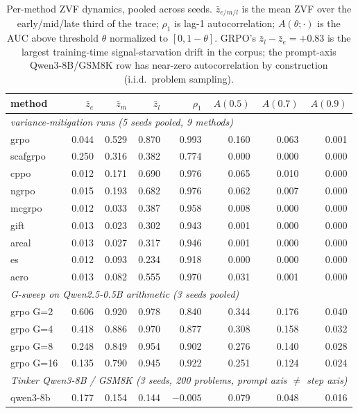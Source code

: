\documentclass{article}
\begin{document}
\begin{table}[htbp]
\centering
\small
\begin{tabular}{lrrrrrrr}
\toprule
method & $\bar z_e$ & $\bar z_m$ & $\bar z_l$ & $\rho_1$ & $A(0.5)$ & $A(0.7)$ & $A(0.9)$ \\
\midrule
\multicolumn{8}{l}{\emph{variance-mitigation runs (5 seeds pooled, 9 methods)}}\\
grpo      & 0.044 & 0.529 & 0.870 & 0.993 & 0.160 & 0.063 & 0.001 \\
scafgrpo  & 0.250 & 0.316 & 0.382 & 0.774 & 0.000 & 0.000 & 0.000 \\
cppo      & 0.012 & 0.171 & 0.690 & 0.976 & 0.065 & 0.010 & 0.000 \\
ngrpo     & 0.015 & 0.193 & 0.682 & 0.976 & 0.062 & 0.007 & 0.000 \\
mcgrpo    & 0.012 & 0.033 & 0.387 & 0.958 & 0.008 & 0.000 & 0.000 \\
gift      & 0.013 & 0.023 & 0.302 & 0.943 & 0.001 & 0.000 & 0.000 \\
areal     & 0.013 & 0.027 & 0.317 & 0.946 & 0.001 & 0.000 & 0.000 \\
es        & 0.012 & 0.093 & 0.234 & 0.918 & 0.000 & 0.000 & 0.000 \\
aero      & 0.013 & 0.082 & 0.555 & 0.970 & 0.031 & 0.001 & 0.000 \\
\midrule
\multicolumn{8}{l}{\emph{G-sweep on Qwen2.5-0.5B arithmetic (3 seeds pooled)}}\\
grpo G=2  & 0.606 & 0.920 & 0.978 & 0.840 & 0.344 & 0.176 & 0.040 \\
grpo G=4  & 0.418 & 0.886 & 0.970 & 0.877 & 0.308 & 0.158 & 0.032 \\
grpo G=8  & 0.248 & 0.849 & 0.954 & 0.902 & 0.276 & 0.140 & 0.028 \\
grpo G=16 & 0.135 & 0.790 & 0.945 & 0.922 & 0.251 & 0.124 & 0.024 \\
\midrule
\multicolumn{8}{l}{\emph{Tinker Qwen3-8B / GSM8K (3 seeds, 200 problems, prompt axis $\neq$ step axis)}}\\
qwen3-8b  & 0.177 & 0.154 & 0.144 & $-0.005$ & 0.079 & 0.048 & 0.016 \\
\bottomrule
\end{tabular}
\caption{Per-method ZVF dynamics, pooled across seeds. $\bar z_{e/m/l}$ is
the mean ZVF over the early/mid/late third of the trace; $\rho_1$ is lag-1
autocorrelation; $A(\theta;\cdot)$ is the AUC above threshold $\theta$
normalized to $[0,1-\theta]$. GRPO's $\bar z_l - \bar z_e = +0.83$ is the
largest training-time signal-starvation drift in the corpus; the
prompt-axis Qwen3-8B/GSM8K row has near-zero autocorrelation by
construction (i.i.d.\ problem sampling).}
\label{tab:zvf-dynamics-pool}
\end{table}
\end{document}
